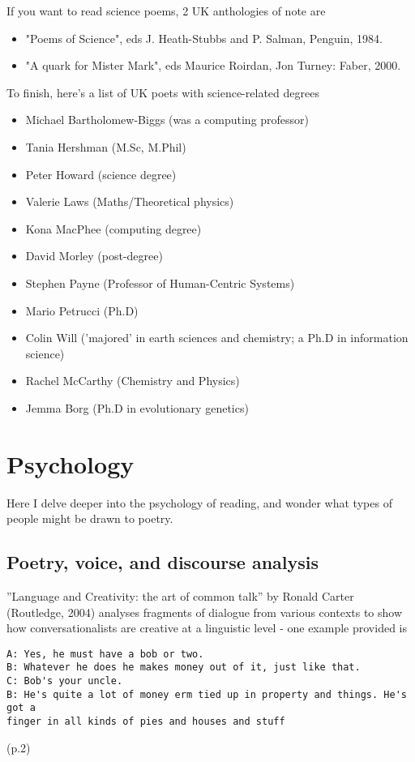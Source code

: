 \documentclass[11pt]{article}
\begin{document}
If you want to read science poems, 2 UK anthologies of note are
\begin{itemize}
\item  "Poems of Science", eds J. Heath-Stubbs and P. Salman, Penguin, 1984.

\item  "A quark for Mister Mark", eds Maurice Roirdan, Jon Turney: Faber, 2000.
\end{itemize}


To finish, here's a list of UK poets with science-related degrees
\begin{itemize}
\item Michael Bartholomew-Biggs (was a computing professor)
\item Tania Hershman (M.Sc, M.Phil)  
\item Peter Howard (science degree)
\item Valerie Laws (Maths/Theoretical physics)
\item Kona MacPhee (computing degree)
\item David Morley (post-degree)
\item Stephen Payne (Professor of Human-Centric Systems)
\item Mario Petrucci (Ph.D)
\item Colin Will ('majored' in earth sciences and chemistry; a Ph.D in
information science)
\item Rachel McCarthy (Chemistry and Physics)
\item Jemma Borg (Ph.D in evolutionary genetics)
\end{itemize}


\newpage
\section{Psychology}

Here I delve deeper into the psychology of reading, and wonder what types of people might be drawn to poetry.


\subsection{Poetry, voice, and discourse analysis}
''Language and Creativity: the art of common talk'' by Ronald Carter (Routledge, 2004) analyses fragments of dialogue from various contexts to show how conversationalists are creative at a linguistic level - one example provided is
\begin{verbatim}
A: Yes, he must have a bob or two.
B: Whatever he does he makes money out of it, just like that.
C: Bob's your uncle.
B: He's quite a lot of money erm tied up in property and things. He's got a 
finger in all kinds of pies and houses and stuff
\end{verbatim} (p.2)
\end{document}
